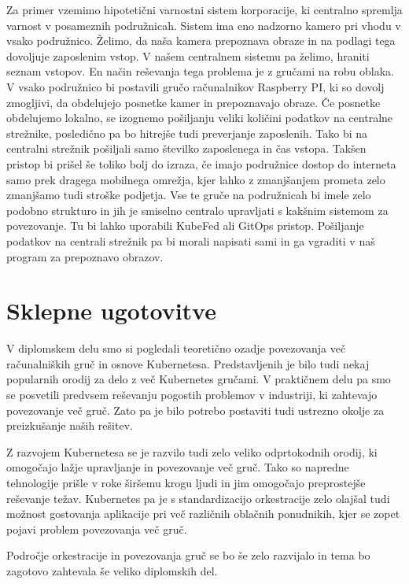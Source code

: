 \documentclass[a4paper, 12pt]{book}
\begin{document}
Za primer vzemimo hipotetični varnostni sistem korporacije, ki centralno spremlja varnost v posameznih podružnicah.
Sistem ima eno nadzorno kamero pri vhodu v vsako podružnico.
Želimo, da naša kamera prepoznava obraze in na podlagi tega dovoljuje zaposlenim vstop.
V našem centralnem sistemu pa želimo, hraniti seznam vstopov.
En način reševanja tega problema je z gručami na robu oblaka.
V vsako podružnico bi postavili gručo rač\-un\-al\-ni\-kov Raspberry PI, ki so dovolj zmogljivi, da obdelujejo posnetke kamer in prepoznavajo obraze.
Če posnetke obdelujemo lokalno, se izognemo pošiljanju veliki količini podatkov na centralne strežnike, posledično pa bo hitrejše tudi preverjanje zaposlenih.
Tako bi na centralni strežnik pošiljali samo številko zaposlenega in čas vstopa.
Takšen pristop bi prišel še toliko bolj do izraza, če imajo podružnice dostop do interneta samo prek dragega mobilnega omrežja, kjer lahko z zmanjšanjem prometa zelo zmanjšamo tudi stroške podjetja.
Vse te gruče na podružnicah bi imele zelo podobno strukturo in jih je smiselno centralo upravljati s kakšnim sistemom za povezovanje. 
Tu bi lahko uporabili KubeFed ali GitOps pristop.
Pošiljanje podatkov na centrali strežnik pa bi morali napisati sami in ga vgraditi v naš program za prepoznavo obrazov.
\chapter{Sklepne ugotovitve}
V diplomskem delu smo si pogledali teoretično ozadje povezovanja več rač\-un\-al\-ni\-ških gruč in osnove Kubernetesa.
Predstavljenih je bilo tudi nekaj popularnih orodij za delo z več Kubernetes gručami.
V praktičnem delu pa smo se posvetili predvsem reševanju pogostih problemov v industriji, ki zahtevajo povezovanje več gruč.
Zato pa je bilo potrebo postaviti tudi ustrezno okolje za preizkušanje naših rešitev.

Z razvojem Kubernetesa se je razvilo tudi zelo veliko odprtokodnih orodij, ki omogočajo lažje upravljanje in povezovanje več gruč.
Tako so napredne tehnologije prišle v roke širšemu krogu ljudi in jim omogočajo preprostejše reševanje težav.
Kubernetes pa je s standardizacijo orkestracije zelo olajšal tudi možnost gostovanja aplikacije pri več različnih oblačnih ponudnikih, kjer se zopet pojavi problem povezovanja več gruč.

Področje orkestracije in povezovanja gruč se bo še zelo razvijalo in tema bo zagotovo zahtevala še veliko diplomskih del.

\newpage %
\newpage %
\newpage %
\newpage %
\ \\
\clearpage
{}


\end{document}

